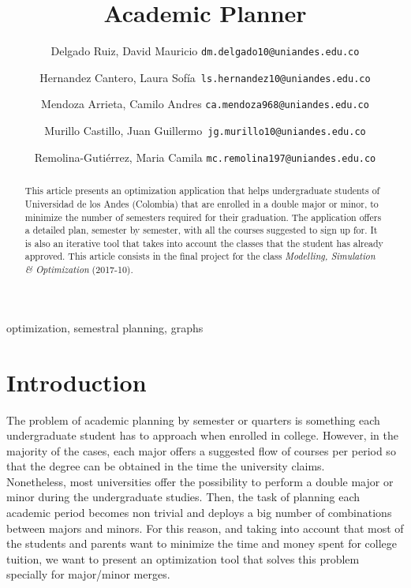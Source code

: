 \documentclass[journal]{IEEEtran}
\begin{document}
\title{Academic Planner}

\author{
    Delgado Ruiz, David Mauricio \texttt{dm.delgado10@uniandes.edu.co}\\ \and 
	Hernandez Cantero, Laura Sof\'ia\ \texttt{ls.hernandez10@uniandes.edu.co}\\ \and
	Mendoza Arrieta, Camilo Andres \texttt{ca.mendoza968@uniandes.edu.co}\\ \and
	Murillo Castillo, Juan Guillermo\ \texttt{jg.murillo10@uniandes.edu.co}\\ \and
  	Remolina-Guti\'errez, Maria Camila \texttt{mc.remolina197@uniandes.edu.co} 
}

\maketitle

\begin{abstract}
This article presents an optimization application that helps undergraduate students of Universidad de los Andes (Colombia) that are enrolled in a double major or minor, to minimize the number of semesters required for their graduation. The application offers a detailed plan, semester by semester, with all the courses suggested to sign up for. It is also an iterative tool that takes into account the classes that the student has already approved. This article consists in the final project for the class \textit{Modelling, Simulation \& Optimization} (2017-10).
\end{abstract}

\begin{IEEEkeywords}
	optimization, semestral planning, graphs
\end{IEEEkeywords}

\section{Introduction}
The problem of academic planning by semester or quarters is something each undergraduate student has to approach when enrolled in college. However, in the majority of the cases, each major offers a suggested flow of courses per period so that the degree can be obtained in the time the university claims. \\

Nonetheless, most universities offer the possibility to perform a double major or minor during the undergraduate studies. Then, the task of planning each academic period becomes non trivial and deploys a big number of combinations between majors and minors. For this reason, and taking into account that most of the students and parents want to minimize the time and money spent for college tuition, we want to present an optimization tool that solves this problem specially for major/minor merges. \\
\end{document}
